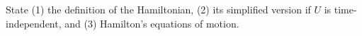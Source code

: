 

\vspace*{\fill}
\centering

State (1) the definition of the Hamiltonian, (2) its simplified version if $U$ is time-independent, and (3) Hamilton's equations of motion.

\centering
\vspace*{\fill}

